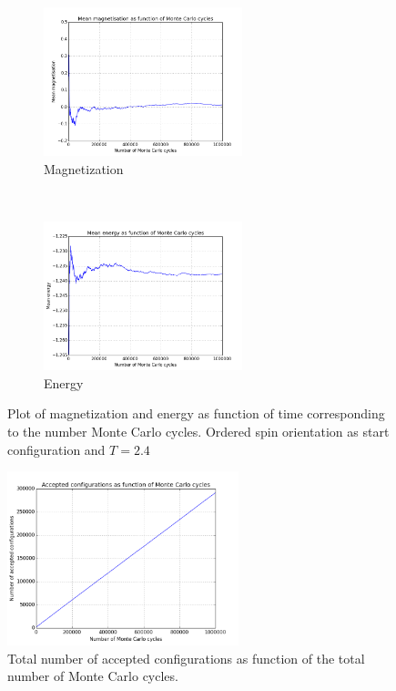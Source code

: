 \documentclass{article}
\begin{document}
\begin{figure}[t!]
    \centering
    \begin{subfigure}[t]{0.6\textwidth}
        \centering
        \includegraphics[height=1.7in]{4cmagnetisation24.png}
        \caption{Magnetization}
    \end{subfigure}%
    ~ 
    \begin{subfigure}[t]{0.6\textwidth}
        \centering
        \includegraphics[height=1.7in]{4cenergy24.png}
        \caption{Energy}
    \end{subfigure}
    \caption{Plot of magnetization and energy as function of time corresponding to the number Monte Carlo cycles. Ordered spin orientation as start configuration and $T = 2.4$}
\end{figure}

\begin{figure}[h]
\centering
\includegraphics[width=0.6\textwidth]{4caccepted.png}
\caption{Total number of accepted configurations as function of the total number of Monte Carlo cycles.}
\end{figure}
\end{document}
